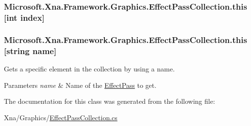 \subsubsection[{this[int index]}]{ Microsoft.\+Xna.\+Framework.\+Graphics.\+Effect\+Pass\+Collection.\+this\mbox{[}int index\mbox{]}\hspace{0.3cm}{\ttfamily [get]}}\label{class_microsoft_1_1_xna_1_1_framework_1_1_graphics_1_1_effect_pass_collection_aaed4571c31d4062f6ed8a8fa404f9da4}
\hypertarget{class_microsoft_1_1_xna_1_1_framework_1_1_graphics_1_1_effect_pass_collection_aee72b784b3f2b28fb748c271ee86b49b}{}
\subsubsection[{this[string name]}]{ Microsoft.\+Xna.\+Framework.\+Graphics.\+Effect\+Pass\+Collection.\+this\mbox{[}string name\mbox{]}\hspace{0.3cm}{\ttfamily [get]}}\label{class_microsoft_1_1_xna_1_1_framework_1_1_graphics_1_1_effect_pass_collection_aee72b784b3f2b28fb748c271ee86b49b}


Gets a specific element in the collection by using a name.


\begin{DoxyParams}{Parameters}
{\em name} & Name of the \hyperlink{class_microsoft_1_1_xna_1_1_framework_1_1_graphics_1_1_effect_pass}{Effect\+Pass} to get.\\
\hline
\end{DoxyParams}


The documentation for this class was generated from the following file\+:\begin{DoxyCompactItemize}
\item 
Xna/\+Graphics/\hyperlink{_effect_pass_collection_8cs}{Effect\+Pass\+Collection.\+cs}\end{DoxyCompactItemize}
